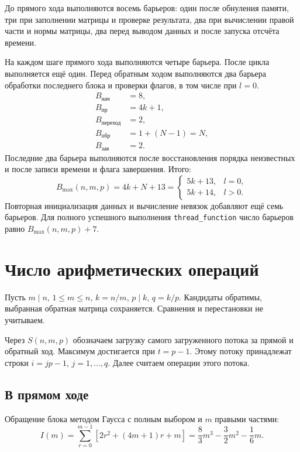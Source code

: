 \documentclass[a4paper,12pt]{article}
\begin{document}
До прямого хода выполняются восемь барьеров: один после обнуления памяти, три при заполнении матрицы и проверке результата, два при вычислении правой части и нормы матрицы, два перед выводом данных и после запуска отсчёта времени.

На каждом шаге прямого хода выполняются четыре барьера. После цикла выполняется ещё один. Перед обратным ходом выполняются два барьера обработки последнего блока и проверки флагов, в том числе при $l = 0$.
\begin{align*}
    B_{\text{нач}} & = 8, \\
    B_{\text{пр}} & = 4k + 1, \\
    B_{\text{переход}} & = 2, \\
    B_{\text{обр}} & = 1 + (N - 1) = N, \\
    B_{\text{зав}} & = 2.
\end{align*}
Последние два барьера выполняются после восстановления порядка неизвестных и после записи времени и флага завершения. Итого:
\[
    B_{\max}(n,m,p) = 4k + N + 13 =
    \begin{cases}
        5k + 13, & l = 0, \\
        5k + 14, & l > 0.
    \end{cases}
\]
Повторная инициализация данных и вычисление невязок добавляют ещё семь барьеров. Для полного успешного выполнения \texttt{thread\_function} число барьеров равно $B_{\max}(n,m,p) + 7$.

\section{Число арифметических операций}
Пусть $m \mid n$, $1 \leq m \leq n$, $k = n/m$, $p \mid k$, $q = k/p$. Кандидаты обратимы, выбранная обратная матрица сохраняется. Сравнения и перестановки не учитываем.

Через $S(n,m,p)$ обозначаем загрузку самого загруженного потока за прямой и обратный ход. Максимум достигается при $t = p - 1$. Этому потоку принадлежат строки $i = jp - 1$, $j = 1, \dots, q$. Далее считаем операции этого потока.

\subsection{В прямом ходе}
Обращение блока методом Гаусса с полным выбором и $m$ правыми частями:
\[
    I(m) = \sum_{r = 0}^{m - 1}\left[2r^2 + (4m + 1)r + m\right]
    = \frac{8}{3}m^3 - \frac{3}{2}m^2 - \frac{1}{6}m.
\]
\end{document}

